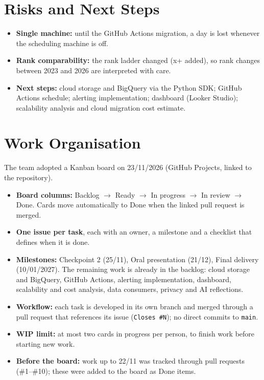 \documentclass[11pt,a4paper]{article}
\begin{document}
\section{Risks and Next Steps}
\begin{itemize}
  \item \textbf{Single machine:} until the GitHub Actions migration, a day is
        lost whenever the scheduling machine is off.
  \item \textbf{Rank comparability:} the rank ladder changed (x+ added), so
        rank changes between 2023 and 2026 are interpreted with care.
  \item \textbf{Next steps:} cloud storage and BigQuery via the Python SDK;
        GitHub Actions schedule; alerting implementation; dashboard (Looker
        Studio); scalability analysis and cloud migration cost estimate.
\end{itemize}

\section{Work Organisation}\label{sec:kanban}
The team adopted a Kanban board on 23/11/2026 (GitHub Projects, linked to the
repository).

\begin{itemize}
  \item \textbf{Board columns:} Backlog $\rightarrow$ Ready $\rightarrow$
        In progress $\rightarrow$ In review $\rightarrow$ Done. Cards move
        automatically to Done when the linked pull request is merged.
  \item \textbf{One issue per task}, each with an owner, a milestone and a
        checklist that defines when it is done.
  \item \textbf{Milestones:} Checkpoint 2 (25/11), Oral presentation (21/12),
        Final delivery (10/01/2027). The remaining work is already in the
        backlog: cloud storage and BigQuery, GitHub Actions, alerting
        implementation, dashboard, scalability and cost analysis, data
        consumers, privacy and AI reflections.
  \item \textbf{Workflow:} each task is developed in its own branch and
        merged through a pull request that references its issue
        (\texttt{Closes \#N}); no direct commits to \texttt{main}.
  \item \textbf{WIP limit:} at most two cards in progress per person, to
        finish work before starting new work.
  \item \textbf{Before the board:} work up to 22/11 was tracked through pull
        requests (\#1--\#10); these were added to the board as Done items.
\end{itemize}
\end{document}
